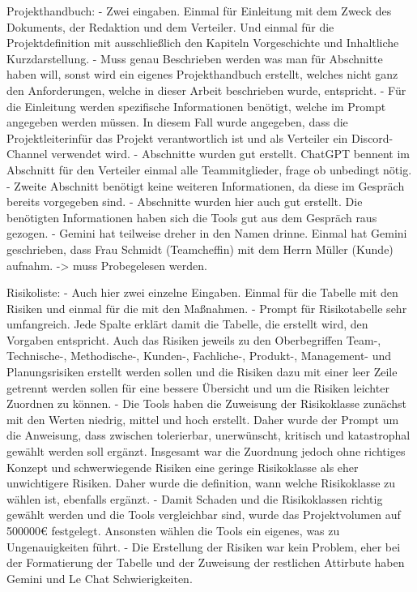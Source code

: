     Projekthandbuch:
        - Zwei eingaben. Einmal für Einleitung mit dem Zweck des Dokuments, der Redaktion und dem Verteiler. Und einmal für die 
        Projektdefinition mit ausschließlich den Kapiteln Vorgeschichte und Inhaltliche Kurzdarstellung.
        - Muss genau Beschrieben werden was man für Abschnitte haben will, sonst wird ein eigenes Projekthandbuch erstellt, welches 
        nicht ganz den Anforderungen, welche in dieser Arbeit beschrieben wurde, entspricht.
        - Für die Einleitung werden spezifische Informationen benötigt, welche im Prompt angegeben werden müssen. In diesem Fall wurde 
        angegeben, dass die Projektleiterinfür das Projekt verantwortlich ist und als Verteiler ein Discord-Channel verwendet wird.
        - Abschnitte wurden gut erstellt. ChatGPT bennent im Abschnitt für den Verteiler einmal alle Teammitglieder, frage ob unbedingt nötig.
        - Zweite Abschnitt benötigt keine weiteren Informationen, da diese im Gespräch bereits vorgegeben sind. 
        - Abschnitte wurden hier auch gut erstellt. Die benötigten Informationen haben sich die Tools gut aus dem Gespräch raus gezogen.
        - Gemini hat teilweise dreher in den Namen drinne. Einmal hat Gemini geschrieben, dass Frau Schmidt (Teamcheffin) mit dem Herrn Müller 
        (Kunde) aufnahm. -> muss Probegelesen werden.


    Risikoliste:
        - Auch hier zwei einzelne Eingaben. Einmal für die Tabelle mit den Risiken und einmal für die mit den Maßnahmen.
        - Prompt für Risikotabelle sehr umfangreich. Jede Spalte erklärt damit die Tabelle, die erstellt wird, den Vorgaben entspricht. 
        Auch das Risiken jeweils zu den Oberbegriffen Team-, Technische-, Methodische-, Kunden-, Fachliche-, Produkt-, Management- und 
        Planungsrisiken erstellt werden sollen und die Risiken dazu mit einer leer Zeile getrennt werden sollen für eine bessere Übersicht 
        und um die Risiken leichter Zuordnen zu können.
        - Die Tools haben die Zuweisung der Risikoklasse zunächst mit den Werten niedrig, mittel und hoch erstellt. Daher wurde der 
        Prompt um die Anweisung, dass zwischen tolerierbar, unerwünscht, kritisch und katastrophal gewählt werden soll ergänzt.
        Insgesamt war die Zuordnung jedoch ohne richtiges Konzept und schwerwiegende Risiken eine geringe Risikoklasse als eher unwichtigere
        Risiken. Daher wurde die definition, wann welche Risikoklasse zu wählen ist, ebenfalls ergänzt.
        - Damit Schaden und die Risikoklassen richtig gewählt werden und die Tools vergleichbar sind, wurde das Projektvolumen auf 500000€
        festgelegt. Ansonsten wählen die Tools ein eigenes, was zu Ungenauigkeiten führt.
        - Die Erstellung der Risiken war kein Problem, eher bei der Formatierung der Tabelle und der Zuweisung der restlichen Attirbute haben
        Gemini und Le Chat Schwierigkeiten.
        
